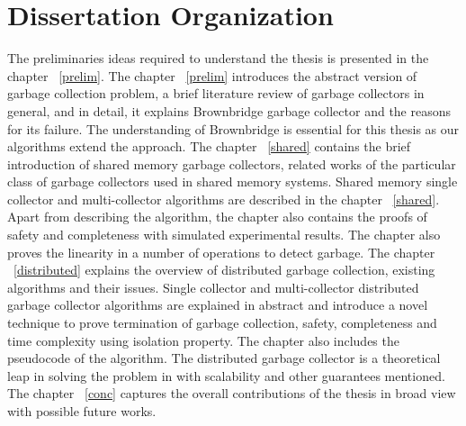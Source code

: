 \section{Dissertation Organization}
\label{intro:do}
The preliminaries ideas required to understand the thesis is presented in the chapter ~\ref{prelim}. The chapter ~\ref{prelim} introduces the abstract version of garbage collection problem, a brief literature review of garbage collectors in general, and in detail, it explains Brownbridge garbage collector and the reasons for its failure. The understanding of Brownbridge is essential for this thesis as our algorithms extend the approach. The chapter ~\ref{shared} contains the brief introduction of shared memory garbage collectors, related works of the particular class of garbage collectors used in shared memory systems. Shared memory single collector and multi-collector algorithms are described in the chapter ~\ref{shared}. Apart from describing the algorithm, the chapter also contains the proofs of safety and completeness with simulated experimental results. The chapter also proves the linearity in a number of operations to detect garbage. The chapter ~\ref{distributed} explains the overview of distributed garbage collection, existing algorithms and their issues. Single collector and multi-collector distributed garbage collector algorithms are explained in abstract and introduce a novel technique to prove termination of garbage collection, safety, completeness and time complexity using isolation property. The chapter also includes the pseudocode of the algorithm. The distributed garbage collector is a theoretical leap in solving the problem in with scalability and other guarantees mentioned. The chapter ~\ref{conc} captures the overall contributions of the thesis in broad view with possible future works.